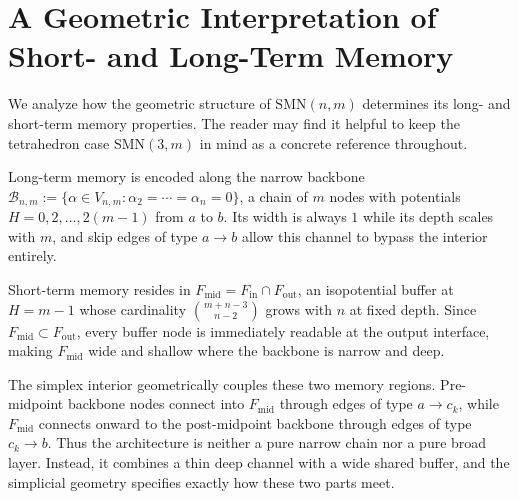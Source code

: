 \section{A Geometric Interpretation of Short- and Long-Term Memory}
\label{sec:interpretation}

We analyze how the geometric structure of $\mathrm{SMN}(n,m)$ determines its long- and short-term memory properties.  The reader may find it helpful to keep the tetrahedron case $\mathrm{SMN}(3,m)$ in mind as a concrete reference throughout.

Long-term memory is encoded along the narrow backbone $\mathcal{B}_{n,m} := \{\alpha \in V_{n,m} : \alpha_2 = \cdots = \alpha_n = 0\}$, a chain of $m$ nodes with potentials $H = 0, 2, \ldots, 2(m{-}1)$ from $a$ to $b$.  Its width is always $1$ while its depth scales with $m$, and skip edges of type $a \to b$ allow this channel to bypass the interior entirely.

Short-term memory resides in $F_{\mathrm{mid}} = F_{\mathrm{in}} \cap F_{\mathrm{out}}$, an isopotential buffer at $H = m-1$ whose cardinality $\binom{m+n-3}{n-2}$ grows with $n$ at fixed depth.  Since $F_{\mathrm{mid}} \subset F_{\mathrm{out}}$, every buffer node is immediately readable at the output interface, making $F_{\mathrm{mid}}$ wide and shallow where the backbone is narrow and deep.

The simplex interior geometrically couples these two memory regions.  Pre-midpoint backbone nodes connect into $F_{\mathrm{mid}}$ through edges of type $a \to c_k$, while $F_{\mathrm{mid}}$ connects onward to the post-midpoint backbone through edges of type $c_k \to b$.  Thus the architecture is neither a pure narrow chain nor a pure broad layer.  Instead, it combines a thin deep channel with a wide shared buffer, and the simplicial geometry specifies exactly how these two parts meet.
